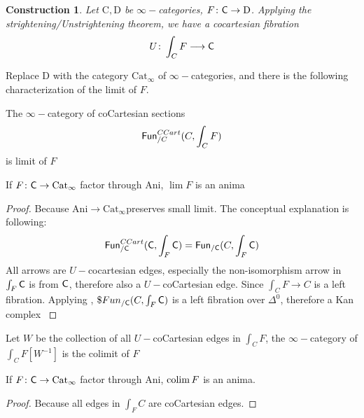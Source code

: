 \documentclass[oneside]{amsart}
\newcommand{\D}{\mathrm{D}}
\newcommand{\Cat}{\mathrm{Cat}}
\newcommand{\Ani}{\mathrm{Ani}}
\newtheorem{construction}[theorem]{Construction}
\begin{document}
\begin{construction}
    Let $\mathrm{C}, \mathrm{D}$ be $\infty-$categories, $F\colon \C \to \D$. Applying the strightening/Unstrightening theorem, we have a cocartesian fibration $$U \colon \int_C F \to \C$$
\end{construction}

Replace $\D$ with the category $\Cat_\infty$ of $\infty-$categories, and there is the following characterization of the limit of $F$.



\begin{proposition}\cite[\href{https://kerodon.net/tag/05RX}{Tag 05RX}]{kerodon}
    The $\infty-$category of coCartesian sections $$\mathsf{Fun}^{CCart}_{/C}(C , \int_C F)$$ is limit of $F$
\end{proposition}

\begin{corollary}\cite[\href{https://kerodon.net/tag/05RY}{Tag 05RY}]{kerodon}
    If $F\colon \C \to \Cat_\infty$ factor through $\Ani$, $\lim F$ is an anima
\end{corollary}

\begin{proof}
    Because $\Ani \to \Cat_\infty$preserves small limit. The conceptual explanation is following:
    \[  
        \mathsf{Fun}^{CCart}_{/\mathsf{C}}(\mathsf{C} , \int_F\mathsf{C}) = \mathsf{Fun}_{/\mathsf{C}}(C, \int_F \mathsf{C})
    \]
  All arrows are $U-$cocartesian edges, especially the non-isomorphism arrow in $\int_F \mathsf{C}$ is from $\mathsf{C}$, therefore also a $U-$coCartesian edge. Since $\int_C F \to C$ is a left fibration. Applying \cite[\href{https://kerodon.net/tag/01GY}{Tag 01GY}]{kerodon}, $\$Fun_{/\mathsf{C}}(C, \int_F \mathsf{C})$ is a left fibration over $\Delta^0$, therefore a Kan complex \cite[\href{https://kerodon.net/tag/019D}{Tag 019D}]{kerodon}
\end{proof}

\begin{proposition}
    Let $W$ be the collection of all $U-$coCartesian edges in $\int_CF$, the $\infty-$category of \(
        \int_C F[W^{-1}]
    \) is the colimit of $F$
\end{proposition}

\begin{corollary}
      If $F\colon \C \to \Cat_\infty$ factor through $\Ani$, $\operatorname*{colim} F$ is an anima.
\end{corollary}

\begin{proof}
    Because all edges in $\int_F C$ are coCartesian edges.
\end{proof}
\end{document}
